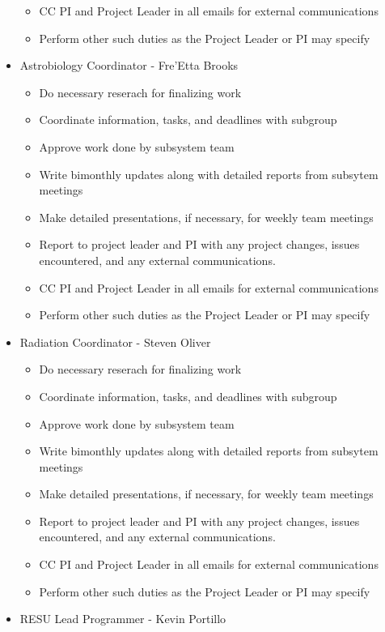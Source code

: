 \begin{itemize}
\begin{itemize}
	\item CC PI and Project Leader in all emails for external communications
	\item Perform other such duties as the Project Leader or PI may specify
	\end{itemize}
\item Astrobiology Coordinator - Fre'Etta Brooks
	\begin{itemize}
	\item Do necessary reserach for finalizing work
	\item Coordinate information, tasks, and deadlines with subgroup
	\item Approve work done by subsystem team
	\item Write bimonthly updates along with detailed reports from subsytem meetings
	\item Make detailed presentations, if necessary, for weekly team meetings
	\item Report to project leader and PI with any project changes, issues encountered, and any external communications.
	\item CC PI and Project Leader in all emails for external communications
	\item Perform other such duties as the Project Leader or PI may specify
	\end{itemize}
\item Radiation Coordinator - Steven Oliver
	\begin{itemize}
	\item Do necessary reserach for finalizing work
	\item Coordinate information, tasks, and deadlines with subgroup
	\item Approve work done by subsystem team
	\item Write bimonthly updates along with detailed reports from subsytem meetings
	\item Make detailed presentations, if necessary, for weekly team meetings
	\item Report to project leader and PI with any project changes, issues encountered, and any external communications.
	\item CC PI and Project Leader in all emails for external communications
	\item Perform other such duties as the Project Leader or PI may specify
	\end{itemize}
\item RESU Lead Programmer - Kevin Portillo
	\begin{itemize}

\end{itemize}
\end{itemize}
